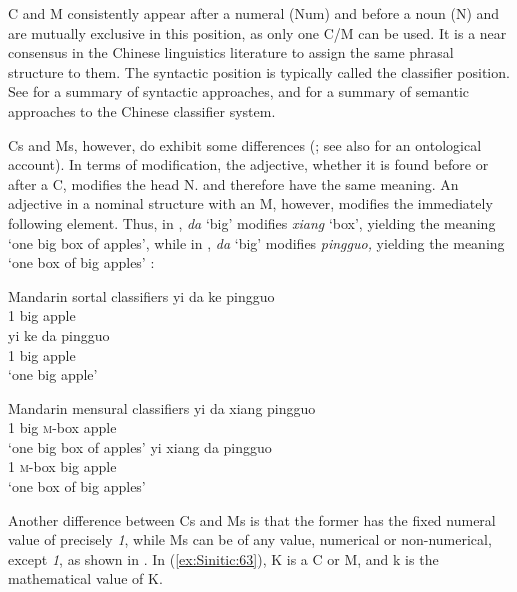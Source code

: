 \documentclass[output=paper,chinesefont,hidelinks]{langscibook}
\begin{document}
\noindent C and M consistently appear after a numeral (Num) and before a noun (N) and are mutually exclusive in this position, as only one C/M can be used. It is a near consensus in the Chinese linguistics literature to assign the same phrasal structure to them. The syntactic position is typically called the classifier position. See \citet{JiangJenksJi2022} for a summary of syntactic approaches, and \citet{ChenAhrensHuang2022} for a summary of semantic approaches to the Chinese classifier system.

  Cs and Ms, however, do exhibit some differences (\citealt{Chao1968,Her2017}; see also \citealt{Huang2005} for an ontological account). In terms of modification, the adjective, whether it is found before or after a C, modifies the head N.  and  therefore have the same meaning. An adjective in a nominal structure with an M, however, modifies the immediately following element. Thus, in , \textit{da} `big' modifies \textit{xiang} `box', yielding the meaning `one big box of apples', while in , \textit{da} `big' modifies \textit{pingguo,} yielding the meaning `one box of big apples' \citep{Her2012b}:

\ea%
    \label{ex:Sinitic:61} Mandarin sortal classifiers 
\ea\label{ex:Sinitic:61a} \gll yi   da  ke  pingguo\\
         1   big {\CLF}   apple\\
\ex\label{ex:Sinitic:61b} \gll yi  ke da     pingguo\\
         1   {\CLF} big  apple\\
    \glt`one big apple'
    \z\z

\ea%
    \label{ex:Sinitic:62} Mandarin mensural classifiers 
\ea\label{ex:Sinitic:62a} \gll yi   da  xiang   pingguo\\
1   big \textsc{m}-box apple\\
\glt`one big box of apples'
\ex\label{ex:Sinitic:62b} \gll yi   xiang   da   pingguo\\
         1    \textsc{m}-box big  apple\\
    \glt`one box of big apples'
    \z\z

Another difference between Cs and Ms is that the former has the fixed numeral value of precisely \textit{1}, while Ms can be of any value, numerical or non-numerical, except \textit{1}, as shown in . In (\ref{ex:Sinitic:63}), K is a C or M, and k is the mathematical value of K. 
\end{document}
